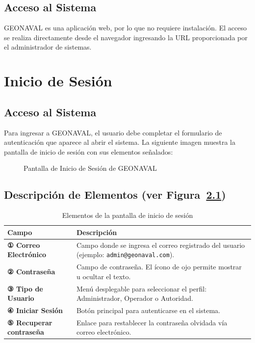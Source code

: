 \documentclass[12pt,a4paper]{report}
\begin{document}
\section{Acceso al Sistema}

GEONAVAL es una aplicación web, por lo que no requiere instalación. El acceso se realiza directamente desde el navegador ingresando la URL proporcionada por el administrador de sistemas.

\chapter{Inicio de Sesión}

\section{Acceso al Sistema}

Para ingresar a GEONAVAL, el usuario debe completar el formulario de autenticación que aparece al abrir el sistema. La siguiente imagen muestra la pantalla de inicio de sesión con sus elementos señalados:

\begin{figure}[H]
  \centering
  \fbox{\rule{0pt}{4cm}\hspace{10cm}}
  \caption{Pantalla de Inicio de Sesión de GEONAVAL}
  \label{fig:login}
\end{figure}

\section{Descripción de Elementos (ver Figura~\ref{fig:login})}

\begin{table}[H]
  \centering
  \renewcommand{\arraystretch}{1.4}
  \begin{tabularx}{\textwidth}{@{}L{4.5cm} X@{}}
    \toprule
    \textbf{Campo} & \textbf{Descripción} \\
    \midrule
    \textbf{① Correo Electrónico} & Campo donde se ingresa el correo registrado del usuario (ejemplo: \texttt{admin@geonaval.com}). \\
    \textbf{② Contraseña} & Campo de contraseña. El ícono de ojo permite mostrar u ocultar el texto. \\
    \textbf{③ Tipo de Usuario} & Menú desplegable para seleccionar el perfil: Administrador, Operador o Autoridad. \\
    \textbf{④ Iniciar Sesión} & Botón principal para autenticarse en el sistema. \\
    \textbf{⑤ Recuperar contraseña} & Enlace para restablecer la contraseña olvidada vía correo electrónico. \\
    \bottomrule
  \end{tabularx}
  \caption{Elementos de la pantalla de inicio de sesión}
\end{table}
\end{document}
